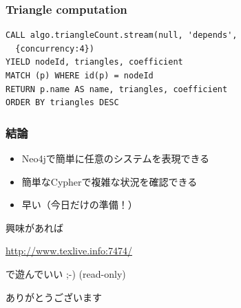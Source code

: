 \documentclass[hyperref]{beamer}
\newcommand{\bis}{\\[\bigskipamount]}
\begin{document}
\begin{frame}[fragile]
  \frametitle{Triangle computation}
\begin{lstlisting}
CALL algo.triangleCount.stream(null, 'depends',
  {concurrency:4})
YIELD nodeId, triangles, coefficient
MATCH (p) WHERE id(p) = nodeId
RETURN p.name AS name, triangles, coefficient
ORDER BY triangles DESC
\end{lstlisting}
\end{frame}

\begin{frame}
  \frametitle{結論}
  \begin{itemize}
  \item Neo4jで簡単に任意のシステムを表現できる\bis\pause
  \item 簡単なCypherで複雑な状況を確認できる\bis\pause
  \item 早い（今日だけの準備！）\bis\pause
  \end{itemize}

  興味があれば
  \begin{center}
    \url{http://www.texlive.info:7474/}
  \end{center}
  で遊んでいい ;-) (read-only)

  \pause
  ありがとうございます
\end{frame}
\end{document}
